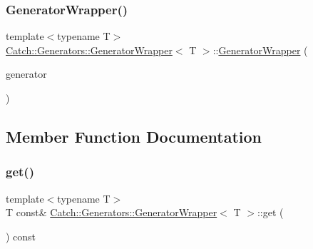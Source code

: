 \subsubsection{\texorpdfstring{GeneratorWrapper()}{GeneratorWrapper()}}
{\footnotesize\ttfamily template$<$typename T$>$ \\
\mbox{\hyperlink{class_catch_1_1_generators_1_1_generator_wrapper}{Catch\+::\+Generators\+::\+Generator\+Wrapper}}$<$ T $>$\+::\mbox{\hyperlink{class_catch_1_1_generators_1_1_generator_wrapper}{Generator\+Wrapper}} (\begin{DoxyParamCaption}\item[{std\+::unique\+\_\+ptr$<$ \mbox{\hyperlink{struct_catch_1_1_generators_1_1_i_generator}{I\+Generator}}$<$ T $>$$>$}]{generator }\end{DoxyParamCaption})\hspace{0.3cm}{\ttfamily [inline]}}



\subsection{Member Function Documentation}
\mbox{\label{class_catch_1_1_generators_1_1_generator_wrapper_a271f0f905f2c473c907550435b81e102}} 
\subsubsection{\texorpdfstring{get()}{get()}}
{\footnotesize\ttfamily template$<$typename T$>$ \\
T const\& \mbox{\hyperlink{class_catch_1_1_generators_1_1_generator_wrapper}{Catch\+::\+Generators\+::\+Generator\+Wrapper}}$<$ T $>$\+::get (\begin{DoxyParamCaption}{ }\end{DoxyParamCaption}) const\hspace{0.3cm}{\ttfamily [inline]}}

\mbox{\label{class_catch_1_1_generators_1_1_generator_wrapper_acbfdca94811ae02461bd2cf5f60b666e}} 
